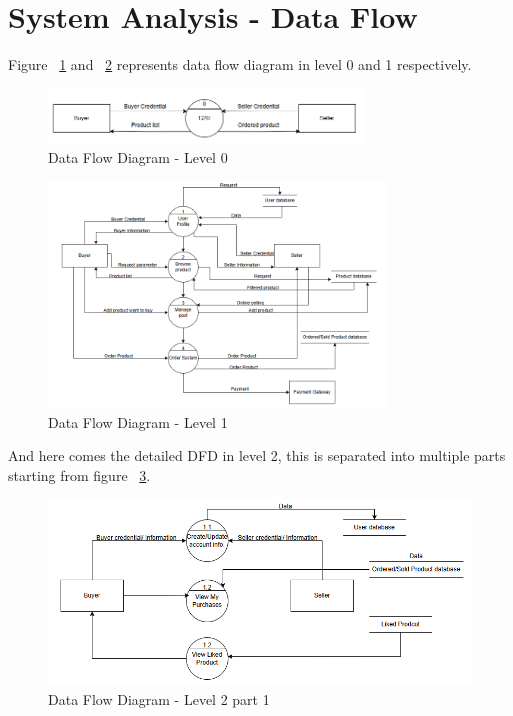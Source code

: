\section{System Analysis - Data Flow}

Figure ~\ref{fig:DFD0} and ~\ref{fig:DFD1} represents data flow diagram in level 0 and 1 respectively.

\begin{figure}[!h]
	\centering
	\includegraphics[width=0.75\textwidth]{chapters/ch-03/DFDL0.png} %
	\caption{Data Flow Diagram - Level 0}
	\label{fig:DFD0} %
\end{figure}

\begin{figure}[!h]
	\centering
	\includegraphics[width=0.8\textwidth]{chapters/ch-03/DFDL1.png} %
	\caption{Data Flow Diagram - Level 1}
	\label{fig:DFD1} %
\end{figure}

And here comes the detailed DFD in level 2, this is separated into multiple parts starting from figure ~\ref{fig:DFD2}.

\begin{figure}[!h]
	\centering
	\includegraphics[width=1\textwidth]{chapters/ch-03/DFDL2_1.png} %
	\caption{Data Flow Diagram - Level 2 part 1}
	\label{fig:DFD2} %
\end{figure}

